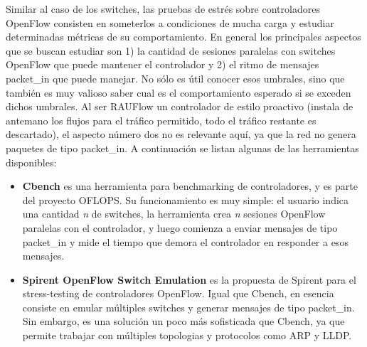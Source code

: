 Similar al caso de los switches, las pruebas de estrés sobre controladores OpenFlow consisten en someterlos a condiciones de mucha carga y estudiar determinadas métricas de su comportamiento. En general los principales aspectos que se buscan estudiar son 1) la cantidad de sesiones paralelas con switches OpenFlow que puede mantener el controlador y 2) el ritmo de mensajes packet\_in que puede manejar. No sólo es útil conocer esos umbrales, sino que también es muy valioso saber cual es el comportamiento esperado si se exceden dichos umbrales. Al ser RAUFlow un controlador de estilo proactivo (instala de antemano los flujos para el tráfico permitido, todo el tráfico restante es descartado), el aspecto número dos no es relevante aquí, ya que la red no genera paquetes de tipo packet\_in. A continuación se listan algunas de las herramientas disponibles:
\begin{itemize}
	\item \textbf{Cbench} \cite{cbench} es una herramienta para benchmarking de controladores, y es parte del proyecto OFLOPS. Su funcionamiento es muy simple: el usuario indica una cantidad \textit{n} de switches, la herramienta crea \textit{n} sesiones OpenFlow paralelas con el controlador, y luego comienza a enviar mensajes de tipo packet\_in y mide el tiempo que demora el controlador en responder a esos mensajes.
	\item \textbf{Spirent OpenFlow Switch Emulation} \cite{spirent-switch-emulation} es la propuesta de Spirent para el stress-testing de controladores OpenFlow. Igual que Cbench, en esencia consiste en emular múltiples switches y generar mensajes de tipo packet\_in. Sin embargo, es una solución un poco más sofisticada que Cbench, ya que permite trabajar con múltiples topologias y protocolos como ARP y LLDP.
\end{itemize}


